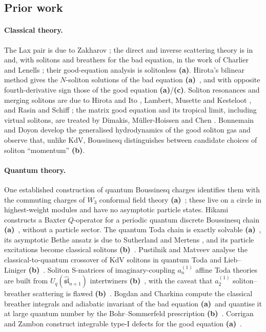\documentclass[11pt,a4paper]{article}
\newcommand{\lab}[1]{{\normalfont\sffamily\footnotesize\bfseries(#1)}}
\newcommand{\La}{\lab{a}}
\newcommand{\Lb}{\lab{b}}
\newcommand{\Lc}{\lab{c}}
\theoremstyle{remark}
\begin{document}
\subsection{Prior work}

\paragraph{Classical theory.} The Lax pair is due to Zakharov \cite{Zak}; the direct and inverse scattering theory is in \cite{DTT} and, with solitons and breathers for the bad equation, in the work of Charlier and Lenells \cite{CL-WW,CL-SOL,CL-SR}; their good-equation analysis \cite{CL-GB} is solitonless \La. Hirota's bilinear method gives the $N$-soliton solutions of the bad equation \La~\cite{Hirota73}, and with opposite fourth-derivative sign those of the good equation \La/\Lc. Soliton resonances and merging solitons are due to Hirota and Ito \cite{HI}, Lambert, Musette and Kesteloot \cite{LMK}, and Rasin and Schiff \cite{RS}; the matrix good equation and its tropical limit, including virtual solitons, are treated by Dimakis, M\"uller-Hoissen and Chen \cite{DMHC}. Bonnemain and Doyon develop the generalised hydrodynamics of the good soliton gas \cite{BD} and observe that, unlike KdV, Boussinesq distinguishes between candidate choices of soliton ``momentum'' \Lb.

\paragraph{Quantum theory.} One established construction of quantum Boussinesq charges identifies them with the commuting charges of $W_3$ conformal field theory \La~\cite{KM,Bordner,BHK,MR,Ashok1,Ashok2}; these live on a circle in highest-weight modules and have no asymptotic particle states. Hikami constructs a Baxter $Q$-operator for a periodic quantum discrete Boussinesq chain \La~\cite{Hikami}, without a particle sector. The quantum Toda chain is exactly solvable \La~\cite{Gutzwiller,Sklyanin}, its asymptotic Bethe ansatz is due to Sutherland and Mertens \cite{Sutherland,Mertens}, and its particle excitations become classical solitons \Lb~\cite{Mertens,SS,PM}. Pustilnik and Matveev analyse the classical-to-quantum crossover of KdV solitons in quantum Toda and Lieb--Liniger \Lb~\cite{PM}. Soliton S-matrices of imaginary-coupling $a_n^{(1)}$ affine Toda theories are built from $U_q(\widehat{\mathfrak{sl}}_{n+1})$ intertwiners \Lb~\cite{Hol92,Hol93,Johnson,Gand}, with the caveat that $a_2^{(1)}$ soliton--breather scattering is flawed \Lb~\cite{TW}. Bogdan and Charkina compute the classical breather integrals and adiabatic invariant of the bad equation \La\ and quantise it at large quantum number by the Bohr--Sommerfeld prescription \Lb~\cite{BC}. Corrigan and Zambon construct integrable type-I defects for the good equation \La~\cite{CZ}.
\end{document}
